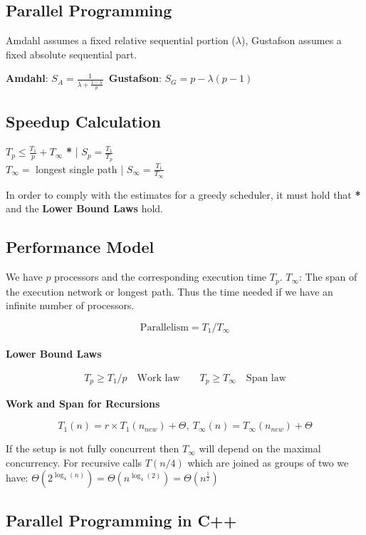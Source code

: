 \documentclass[9pt,landscape,a4paper, table]{extarticle}
\begin{document}
\begin{multicols*}{3}
\section{Parallel Programming}
Amdahl assumes a fixed relative sequential portion ($\lambda$), Gustafson assumes a fixed absolute sequential part.

\textbf{Amdahl}: $S_A = \frac{1}{\lambda + \frac{1-\lambda}{p}}$\ \textbf{Gustafson}: $S_G=p-\lambda(p-1)$

\subsection{Speedup Calculation}
$T_p \leq \frac{T_1}{p} + T_\infty $ \textbf{*} |  $S_p = \frac{T_1}{T_p}$\\
$T_{\infty} = $ longest single path | $S_{\infty} = \frac{T_1}{T_{\infty}}$

In order to comply with the estimates for a greedy scheduler, it must hold that \textbf{*} and the \textbf{Lower Bound Laws} hold. 
\subsection{Performance Model}

We have $p$ processors and the corresponding execution time $T_p$.
$T_{\infty}$: The span of the execution network or longest path. Thus the time needed if we have an infinite number of processors. 

$$\text{Parallelism} = T_1/T_\infty$$\\

\textbf{Lower Bound Laws}

\begin{align*}
    T_p \geq T_1/p\quad \text{Work law}
    \qquad T_p \geq T_\infty\quad \text{Span law}
\end{align*}

\textbf{Work and Span for Recursions}

$$T_1(n) = r\times T_1(n_{new}) + \Theta,\ T_\infty(n) = T_\infty(n_{new}) + \Theta$$

If the setup is not fully concurrent then $T_\infty$ will depend on the maximal concurrency. For recursive calls $T(n/4)$ which are joined as groups of two we have: $\Theta(2^{\log_4(n)}) = \Theta(n^{\log_4(2)}) = \Theta(n^{\frac{1}{2}})$

\subsection{Parallel Programming in C++}


\end{multicols*}
\end{document}
